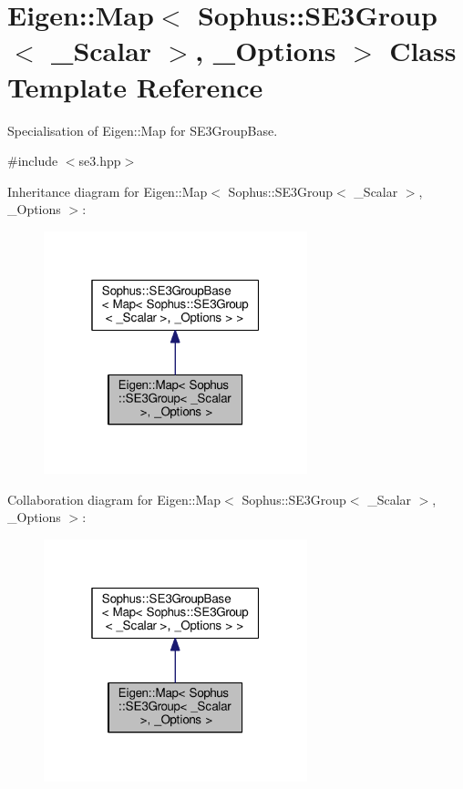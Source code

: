 \hypertarget{class_eigen_1_1_map_3_01_sophus_1_1_s_e3_group_3_01___scalar_01_4_00_01___options_01_4}{}\section{Eigen\+:\+:Map$<$ Sophus\+:\+:S\+E3\+Group$<$ \+\_\+\+Scalar $>$, \+\_\+\+Options $>$ Class Template Reference}
\label{class_eigen_1_1_map_3_01_sophus_1_1_s_e3_group_3_01___scalar_01_4_00_01___options_01_4}


Specialisation of Eigen\+::\+Map for S\+E3\+Group\+Base.  




{\ttfamily \#include $<$se3.\+hpp$>$}



Inheritance diagram for Eigen\+:\+:Map$<$ Sophus\+:\+:S\+E3\+Group$<$ \+\_\+\+Scalar $>$, \+\_\+\+Options $>$\+:
\nopagebreak
\begin{figure}[H]
\begin{center}
\leavevmode
\includegraphics[width=217pt]{class_eigen_1_1_map_3_01_sophus_1_1_s_e3_group_3_01___scalar_01_4_00_01___options_01_4__inherit__graph}
\end{center}
\end{figure}


Collaboration diagram for Eigen\+:\+:Map$<$ Sophus\+:\+:S\+E3\+Group$<$ \+\_\+\+Scalar $>$, \+\_\+\+Options $>$\+:
\nopagebreak
\begin{figure}[H]
\begin{center}
\leavevmode
\includegraphics[width=217pt]{class_eigen_1_1_map_3_01_sophus_1_1_s_e3_group_3_01___scalar_01_4_00_01___options_01_4__coll__graph}
\end{center}
\end{figure}
